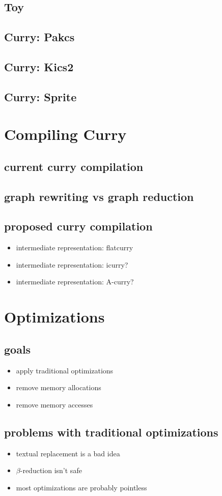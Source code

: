 \documentclass{article}
\begin{document}
\subsection{Toy}
\subsection{Curry: Pakcs}
\subsection{Curry: Kics2}
\subsection{Curry: Sprite}
\section{Compiling Curry}
\subsection{current curry compilation}
\subsection{graph rewriting vs graph reduction}
\subsection{proposed curry compilation}
\begin{itemize}
  \item intermediate representation: flatcurry
  \item intermediate representation: icurry?
  \item intermediate representation: A-curry?
\end{itemize}
\section{Optimizations}
\subsection{goals}
\begin{itemize}
  \item apply traditional optimizations
  \item remove memory allocations
  \item remove memory accesses
\end{itemize}
\subsection{problems with traditional optimizations}
\begin{itemize}
  \item textual replacement is a bad idea
  \item $\beta$-reduction isn't safe
  \item most optimizations are probably pointless
\end{itemize}
\end{document}
